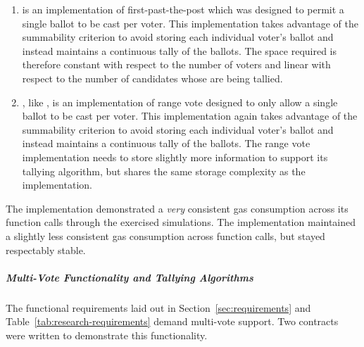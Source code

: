 \begin{enumerate}
  \item {} is an implementation of first-past-the-post which was
    designed to permit a single ballot to be cast per voter. This implementation
    takes advantage of the summability criterion to avoid storing each
    individual voter's ballot and instead maintains a continuous tally of the
    ballots. The space required is therefore constant with respect to the number
    of voters and linear with respect to the number of candidates whose
     are being tallied.

  \item {}, like , is an implementation
    of range vote designed to only allow a single ballot to be cast per voter.
    This implementation again takes advantage of the summability criterion to
    avoid storing each individual voter's ballot and instead maintains a
    continuous tally of the ballots. The range vote implementation needs to
    store slightly more information to support its tallying algorithm, but
    shares the same storage complexity as the  implementation.
\end{enumerate}

The  implementation demonstrated a \emph{very} consistent gas
consumption across its function calls through the exercised simulations.
The  implementation maintained a slightly less consistent
gas consumption across function calls, but stayed respectably stable.

\subparagraph{Multi-Vote Functionality and Tallying Algorithms}
The functional requirements laid out in Section~\ref{sec:requirements} and
Table~\ref{tab:research-requirements} demand multi-vote support. Two contracts
were written to demonstrate this functionality.

